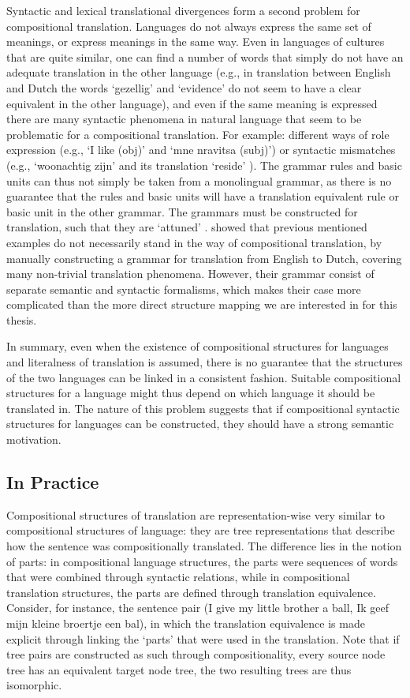 \documentclass{report}
\newcommand\textcyr[1]{{\fontencoding{OT2}\fontfamily{wncyr}\selectfont #1}}
\theoremstyle{break}
\begin{document}
Syntactic and lexical translational divergences form a second problem for compositional translation. Languages do not always express the same set of meanings, or express meanings in the same way. Even in languages of cultures that are quite similar, one can find a number of words that simply do not have an adequate translation in the other language (e.g., in translation between English and Dutch the words `gezellig' and `evidence' do not seem to have a clear equivalent in the other language), and even if the same meaning is expressed there are many syntactic phenomena in natural language that seem to be problematic for a compositional translation.  For example: different ways of role expression (e.g., `I like (obj)' and `\textcyr{mne nravitsa (subj)}') or syntactic mismatches (e.g., `woonachtig zijn' and its translation `reside' \citep{landsbergen1989power}).  The grammar rules and basic units can thus not simply be taken from a monolingual grammar, as there is no guarantee that the rules and basic units will have a translation equivalent rule or basic unit in the other grammar. The grammars must be constructed for translation, such that they are `attuned' \citep{rosetta1994compositional}. \cite{rosetta1994compositional} showed that previous mentioned examples do not necessarily stand in the way of compositional translation, by manually constructing a grammar for translation from English to Dutch, covering many non-trivial translation phenomena. However, their grammar consist of separate semantic and syntactic formalisms, which makes their case more complicated than the more direct structure mapping we are interested in for this thesis.

In summary, even when the existence of compositional structures for languages and literalness of translation is assumed, there is no guarantee that the structures of the two languages can be linked in a consistent fashion. Suitable compositional structures for a language might thus depend on which language it should be translated in. The nature of this problem suggests that if compositional syntactic structures for languages  can be constructed, they should have a strong semantic motivation.

\subsection{In Practice}

Compositional structures of translation are representation-wise very similar to compositional structures of language: they are tree representations that describe how the sentence was compositionally translated. The difference lies in the notion of parts: in compositional language structures, the parts were sequences of words that were combined through syntactic relations, while in compositional translation structures, the parts are defined through translation equivalence. Consider, for instance, the sentence pair (I give my little brother a ball, Ik geef mijn kleine broertje een bal), in which the translation equivalence is made explicit through linking the `parts' that were used in the translation. Note that if tree pairs are constructed as such through compositionality, every source node tree has an equivalent target node tree, the two resulting trees are thus isomorphic.
\end{document}
